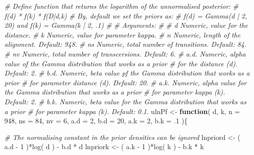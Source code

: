 \documentclass[
]{article}
\newenvironment{Shaded}{\begin{snugshade}}{\end{snugshade}}
\newcommand{\AttributeTok}[1]{\textcolor[rgb]{0.77,0.63,0.00}{#1}}
\newcommand{\CommentTok}[1]{\textcolor[rgb]{0.56,0.35,0.01}{\textit{#1}}}
\newcommand{\ControlFlowTok}[1]{\textcolor[rgb]{0.13,0.29,0.53}{\textbf{#1}}}
\newcommand{\DecValTok}[1]{\textcolor[rgb]{0.00,0.00,0.81}{#1}}
\newcommand{\FunctionTok}[1]{\textcolor[rgb]{0.00,0.00,0.00}{#1}}
\newcommand{\NormalTok}[1]{#1}
\newcommand{\OtherTok}[1]{\textcolor[rgb]{0.56,0.35,0.01}{#1}}
\newcommand{\SpecialCharTok}[1]{\textcolor[rgb]{0.00,0.00,0.00}{#1}}
\begin{document}
\begin{Shaded}
\begin{Highlighting}[]
\CommentTok{\# Define function that returns the logarithm of the unnormalised posterior:}
\CommentTok{\#                             f(d) * f(k) * f(D|d,k)}
\CommentTok{\# By, default we set the priors as:}
\CommentTok{\#                  f(d) = Gamma(d | 2, 20) and f(k) = Gamma(k | 2, .1)}
\CommentTok{\#}
\CommentTok{\# Arguments:}
\CommentTok{\#}
\CommentTok{\#   d     Numeric, value for the distance.}
\CommentTok{\#   k     Numeric, value for parameter kappa.}
\CommentTok{\#   n     Numeric, length of the alignment. Default: 948.}
\CommentTok{\#   ns    Numeric, total number of transitions. Default: 84.}
\CommentTok{\#   nv    Numeric, total number of transcersions. Default: 6.}
\CommentTok{\#   a.d.  Numeric, alpha value of the Gamma distribution that works as a prior}
\CommentTok{\#         for the distance (d). Default: 2.}
\CommentTok{\#   b.d.  Numeric, beta value pf the Gamma distribution that works as a prior}
\CommentTok{\#         for parameter distance (d). Default: 20.}
\CommentTok{\#   a.k.  Numeric, alpha value for the Gamma distribution that works as a prior}
\CommentTok{\#         for parameter kappa (k). Default: 2.}
\CommentTok{\#   b.k.  Numeric, beta value for the Gamma distribution that works as a prior}
\CommentTok{\#         for parameter kappa (k). Default: 0.1.}
\NormalTok{ulnPf }\OtherTok{\textless{}{-}} \ControlFlowTok{function}\NormalTok{( d, k, }\AttributeTok{n =} \DecValTok{948}\NormalTok{, }\AttributeTok{ns =} \DecValTok{84}\NormalTok{, }\AttributeTok{nv =} \DecValTok{6}\NormalTok{,}
                   \AttributeTok{a.d =} \DecValTok{2}\NormalTok{, }\AttributeTok{b.d =} \DecValTok{20}\NormalTok{, }\AttributeTok{a.k =} \DecValTok{2}\NormalTok{, }\AttributeTok{b.k =}\NormalTok{ .}\DecValTok{1}\NormalTok{ )\{}

  \CommentTok{\# The normalising constant in the prior densities can be ignored}
\NormalTok{  lnpriord }\OtherTok{\textless{}{-}}\NormalTok{ ( a.d }\SpecialCharTok{{-}} \DecValTok{1}\NormalTok{ )}\SpecialCharTok{*}\FunctionTok{log}\NormalTok{( d ) }\SpecialCharTok{{-}}\NormalTok{ b.d }\SpecialCharTok{*}\NormalTok{ d}
\NormalTok{  lnpriork }\OtherTok{\textless{}{-}}\NormalTok{ ( a.k }\SpecialCharTok{{-}} \DecValTok{1}\NormalTok{ )}\SpecialCharTok{*}\FunctionTok{log}\NormalTok{( k ) }\SpecialCharTok{{-}}\NormalTok{ b.k }\SpecialCharTok{*}\NormalTok{ k}


\end{Highlighting}
\end{Shaded}
\end{document}
